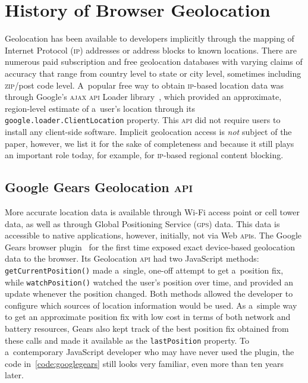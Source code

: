 \documentclass[sigconf,hyphens]{acmart}
\begin{document}


\maketitle

\break

\section{History of Browser Geolocation}

Geolocation has been available to developers implicitly through the mapping of
Internet Protocol (\textsc{ip}) addresses or address blocks to known locations.
There are numerous paid subscription and free geolocation databases
with varying claims of accuracy that range from country level to state or city level,
sometimes including \textsc{zip}/post code level.
A~popular free way to obtain \textsc{ip}-based location data was
through Google's \textsc{ajax} \textsc{api} Loader library~\cite{block2008gears},
which provided an approximate, region-level estimate of a~user's location
through its \texttt{google.loader.ClientLocation} property.
This \textsc{api} did not require users to install any client-side software.
Implicit geolocation access is \textit{not} subject of the paper, however,
we list it for the sake of completeness and because it still plays an important role today,
for example, for \textsc{ip}-based regional content blocking.

\subsection{Google Gears Geolocation \textsc{api}}
\label{sec:googlegears}

More accurate location data is available through Wi-Fi access point or cell tower data,
as well as through Global Positioning Service (\textsc{gps}) data.
This data is accessible to native applications, however, initially, not via Web \textsc{api}s.
The Google Gears browser plugin~\cite{gears2008geolocation} for the first time exposed
exact device-based geolocation data to the browser. 
Its Geolocation \textsc{api} had two JavaScript methods:
\texttt{getCurrentPosition()} made a~single, one-off attempt to get a~position fix,
while \texttt{watchPosition()} watched the user's position over time,
and provided an update whenever the position changed.
Both methods allowed the developer to configure
which sources of location information would be used.
As a~simple way to get an approximate position fix with low cost
in terms of both network and battery resources,
Gears also kept track of the best position fix obtained from these calls
and made it available as the \texttt{lastPosition} property.
To a~contemporary JavaScript developer who may have never used the plugin,
the code in~\autoref{code:googlegears} still looks very familiar,
even more than ten years later.
\end{document}
